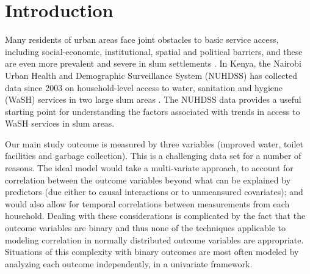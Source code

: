 \section{Introduction}

Many residents of urban areas face joint obstacles to basic service access, including social-economic, institutional, spatial and political barriers, and these are even more prevalent and severe in slum settlements \citep{pierce2017basic}. In Kenya, the Nairobi Urban Health and Demographic Surveillance System (NUHDSS) has collected data since 2003 on household-level access to water, sanitation and hygiene (WaSH) services in two large slum areas \citep{beguy2015health}. The NUHDSS data provides a useful starting point for understanding the factors associated with trends in access to WaSH services in slum areas.

Our main study outcome is measured by three variables (improved water, toilet facilities and garbage collection). This is a challenging data set for a number of reasons. The ideal model would take a multi-variate approach, to account for correlation between the outcome variables beyond what can be explained by predictors (due either to causal interactions or to unmeansured covariates); and would also allow for temporal correlations between measurements from each household. Dealing with these considerations is complicated by the fact that the outcome variables are binary and thus none of the techniques applicable to modeling correlation in normally distributed outcome variables are appropriate. Situations of this complexity with binary outcomes are most often modeled by analyzing each outcome independently, in a univariate framework.


